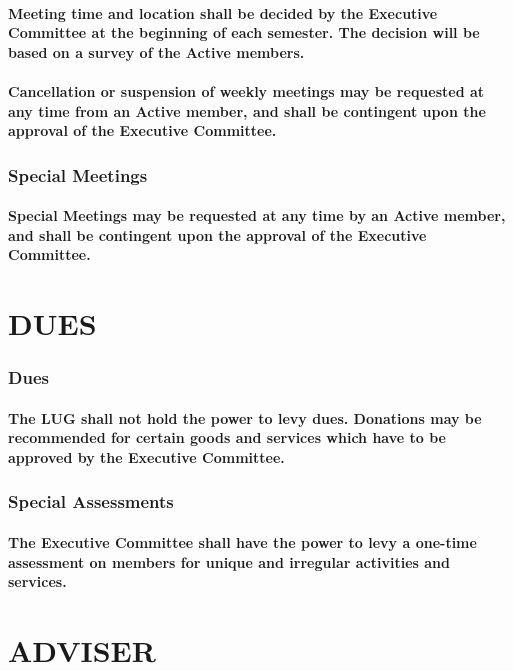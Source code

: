 \documentclass[letter]{report}
\begin{document}
\subsection{Meeting time and location shall be decided by the Executive Committee at the beginning of each semester. The decision will be based on a survey of the Active members.}
\subsection{Cancellation or suspension of weekly meetings may be requested at any time from an Active member, and shall be contingent upon the approval of the Executive Committee.}
\section{Special Meetings}
\subsection{Special Meetings may be requested at any time by an Active member, and shall be contingent upon the approval of the Executive Committee.}

\part{DUES}
\section{Dues}
\subsection{The LUG shall not hold the power to levy dues.  Donations may be recommended for certain goods and services which have to be approved by the Executive Committee.}   
\section{Special Assessments}
\subsection{The Executive Committee shall have the power to levy a one-time assessment on members for unique and irregular activities and services.}

\part{ADVISER}
\end{document}
